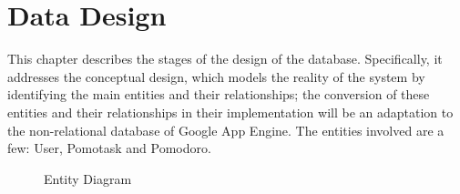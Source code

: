 


\chapter{Data Design}

This chapter describes the stages of the design of the database. Specifically, it addresses the conceptual design, which models the reality of the system by identifying the main entities and their relationships; the conversion of these entities and their relationships in their implementation will be an adaptation to the non-relational database of Google App Engine.
The entities involved are a few: User, Pomotask and Pomodoro.

		\begin{figure}[h!]
		  \centering
		  \caption{Entity Diagram}
		\end{figure}
